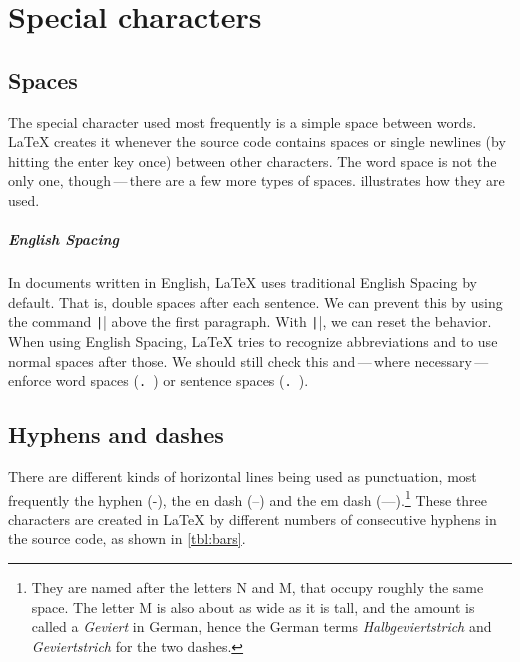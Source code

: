 \chapter{Special characters}

\label{sec:special-characters}

\section{Spaces}

The special character used most frequently is a simple space between words.
\LaTeX{} creates it whenever the source code contains spaces or single newlines (by hitting the enter key once) between other characters.
The word space is not the only one, though\,---\,there are a few more types of spaces.
 illustrates how they are used.


\paragraph{English Spacing}
In documents written in English, \LaTeX{} uses traditional English Spacing by default. That is, double spaces after each sentence.
We can prevent this by using the command \texttt|\frenchspacing| above the first paragraph.
With \texttt|\nonfrenchspacing|, we can reset the behavior.
When using English Spacing, \LaTeX{} tries to recognize abbreviations and to use normal spaces after those.
We should still check this and\,---\,where necessary\,---\,enforce word spaces (\texttt{.\ }) or sentence spaces (\texttt{\@. }).

\section{Hyphens and dashes}
There are different kinds of horizontal lines being used as punctuation,
most frequently the hyphen (-), the en dash (–) and the em dash (—).\footnote{They are named after the letters N and M,
that occupy roughly the same space.
The letter M is also about as wide as it is tall, and the amount is called a \emph{Geviert} in German, hence the German terms \emph{Halbgeviertstrich} and \emph{Geviertstrich} for the two dashes.}
These three characters are created in \LaTeX{} by different numbers of consecutive hyphens in the source code,
as shown in \cref{tbl:bars}.

